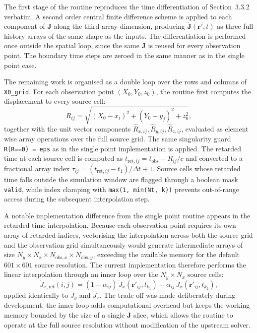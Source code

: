 \documentclass[12pt]{final_project_report}
\begin{document}
The first stage of the routine reproduces the time differentiation of Section~3.3.2 verbatim. A second order central finite difference scheme is applied to each component of $\mathbf{J}$ along the third array dimension, producing $\dot{\mathbf{J}}(\mathbf{r}', t)$ as three full history arrays of the same shape as the inputs. The differentiation is performed once outside the spatial loop, since the same $\dot{\mathbf{J}}$ is reused for every observation point. The boundary time steps are zeroed in the same manner as in the single point case.

The remaining work is organised as a double loop over the rows and columns of \texttt{X0\_grid}. For each observation point $(X_0, Y_0, z_0)$, the routine first computes the displacement to every source cell:
\begin{equation}
    R_{ij} = \sqrt{(X_0 - x_i)^2 + (Y_0 - y_j)^2 + z_0^2},
    \label{eq:R_spatial}
\end{equation}
together with the unit vector components $\hat{R}_{x,ij}, \hat{R}_{y,ij}, \hat{R}_{z,ij}$, evaluated as element wise array operations over the full source grid. The same singularity guard \texttt{R(R==0)~=~eps} as in the single point implementation is applied. The retarded time at each source cell is computed as $t_{\mathrm{ret},ij} = t_{\mathrm{obs}} - R_{ij}/c$ and converted to a fractional array index $\tau_{ij} = (t_{\mathrm{ret},ij} - t_1)/\Delta t + 1$. Source cells whose retarded time falls outside the simulation window are flagged through a boolean mask \texttt{valid}, while index clamping with \texttt{max(1,~min(Nt,~k))} prevents out-of-range access during the subsequent interpolation step.

A notable implementation difference from the single point routine appears in the retarded time interpolation. Because each observation point requires its own array of retarded indices, vectorising the interpolation across both the source grid and the observation grid simultaneously would generate intermediate arrays of size $N_y \times N_x \times N_{\mathrm{obs},x} \times N_{\mathrm{obs},y}$, exceeding the available memory for the default $601 \times 601$ source resolution. The current implementation therefore performs the linear interpolation through an inner loop over the $N_y \times N_x$ source cells:
\begin{equation}
    \dot{J}_{x,\mathrm{ret}}(i,j) = (1 - \alpha_{ij})\,\dot{J}_x(\mathbf{r}'_{ij}, t_{k_1}) + \alpha_{ij}\,\dot{J}_x(\mathbf{r}'_{ij}, t_{k_2}),
    \label{eq:interp_spatial}
\end{equation}
applied identically to $\dot{J}_y$ and $\dot{J}_z$. The trade off was made deliberately during development: the inner loop adds computational overhead but keeps the working memory bounded by the size of a single $\dot{\mathbf{J}}$ slice, which allows the routine to operate at the full source resolution without modification of the upstream solver.
\end{document}
